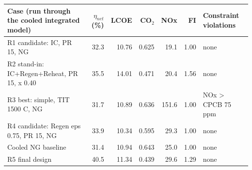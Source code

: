 \begin{tabular}{p{5.0cm}rrrrrp{3.2cm}}\toprule Case (run through the cooled integrated model) & $\eta_{net}$ (\%) & LCOE & CO$_2$ & NOx & FI & Constraint violations\\\midrule
R1 candidate: IC, PR 15, NG & 32.3 & 10.76 & 0.625 & 19.1 & 1.00 & none\\
R2 stand-in: IC+Regen+Reheat, PR 15, x 0.40 & 35.5 & 14.01 & 0.471 & 20.4 & 1.56 & none\\
R3 best: simple, TIT 1500 C, NG & 31.7 & 10.89 & 0.636 & 151.6 & 1.00 & NOx > CPCB 75 ppm\\
R4 candidate: Regen eps 0.75, PR 15, NG & 33.9 & 10.34 & 0.595 & 29.3 & 1.00 & none\\
Cooled NG baseline & 31.4 & 10.94 & 0.643 & 25.0 & 1.00 & none\\
R5 final design & 40.5 & 11.34 & 0.439 & 29.6 & 1.29 & none\\
\bottomrule\end{tabular}